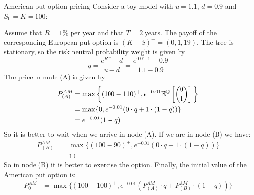 \begin{example}{American put option pricing}{}{}
    Consider a toy model with $u=1.1$, $d=0.9$ and $S_0=K=100$:
    \begin{center}
    \end{center}
    Assume that $R=1\%$ per year and that $T=2$ years. The payoff of the corresponding European put option is $(K-S)^+=(0,1,19)$. The tree is stationary, so the risk neutral probability weight is given by
    \begin{equation*}
        q = \dfrac{e^{RT}-d}{u-d} = \dfrac{e^{0.01\cdot1}-0.9}{1.1-0.9}
    \end{equation*}
    The price in node (A) is given by
    \begin{align*}
        P^{AM}_{(A)} &= \max\bigg\{(100-110)^+,e^{-0.01}\mathbb{E}^{\mathbb{Q}}\left[\binom{0}{1}\right] \bigg\} \\
        &= \max\{0,e^{-0.01}(0\cdot q +1\cdot(1-q))\} \\
        &= e^{-0.01}(1-q)
    \end{align*}
    So it is better to wait when we arrive in node (A). If we are in node (B) we have:
    \begin{align*}
        P^{AM}_{(B)} &= \max\{(100-90)^+, e^{-0.01}(0\cdot q +1\cdot(1-q))\} \\
        &= 10
    \end{align*}
    So in node (B) it is better to exercise the option. Finally, the initial value of the American put option is:
    \begin{align*}
        P^{AM}_{0} &= \max\{(100-100)^+, e^{-0.01}(P^{AM}_{(A)}\cdot q +P^{AM}_{(B)}\cdot(1-q))\} \\

\end{align*}
\end{example}
